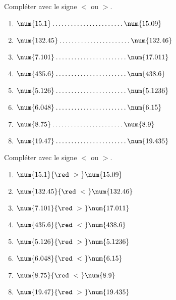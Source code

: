 \begin{exercice}
    Compléter avec le signe $<$ ou $>$. \medskip
    \begin{multicols}{2}
        \begin{spacing}{1.5}
            \begin{enumerate}
                \item $\num{15.1  } \makebox[0.3\linewidth]{\dotfill} \num{15.09 }$ 
                \item $\num{132.45} \makebox[0.3\linewidth]{\dotfill} \num{132.46}$ 
                \item $\num{7.101 } \makebox[0.3\linewidth]{\dotfill} \num{17.011}$ 
                \item $\num{435.6 } \makebox[0.3\linewidth]{\dotfill} \num{438.6 }$ 
                \item $\num{5.126 } \makebox[0.3\linewidth]{\dotfill} \num{5.1236}$
                \item $\num{6.048 } \makebox[0.3\linewidth]{\dotfill} \num{6.15  }$
                \item $\num{8.75  } \makebox[0.3\linewidth]{\dotfill} \num{8.9   }$
                \item $\num{19.47 } \makebox[0.3\linewidth]{\dotfill} \num{19.435}$            
            \end{enumerate}
        \end{spacing}
    \end{multicols}
 \end{exercice}
 
 \begin{corrige}
    Compléter avec le signe $<$ ou $>$. \medskip
    
    \begin{multicols}{2}
        \begin{enumerate}
            \item $\num{15.1  } {\red~>~} \num{15.09 }$ 
            \item $\num{132.45} {\red~<~} \num{132.46}$ 
            \item $\num{7.101 } {\red~>~} \num{17.011}$ 
            \item $\num{435.6 } {\red~<~} \num{438.6 }$ 
            \item $\num{5.126 } {\red~>~} \num{5.1236}$
            \item $\num{6.048 } {\red~<~} \num{6.15  }$
            \item $\num{8.75  } {\red~<~} \num{8.9   }$
            \item $\num{19.47 } {\red~>~} \num{19.435}$
        \end{enumerate}
    \end{multicols}
\end{corrige}